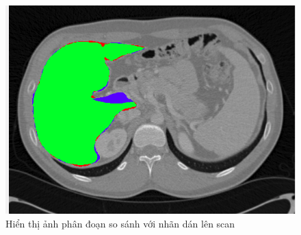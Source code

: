 \begin{figure}[h]
\centering
    \includegraphics[totalheight=7cm]{Images/app_overlap_2.png}
    \caption{Hiển thị ảnh phân đoạn so sánh với nhãn dán lên scan}
    \label{skip_conn}
\end{figure}

